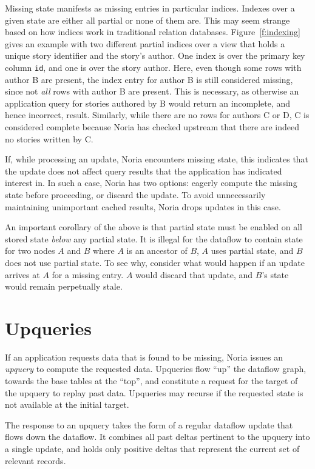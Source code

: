 Missing state manifests as missing entries in particular indices. Indexes over a
given state are either all partial or none of them are. This may seem strange
based on how indices work in traditional relation databases.
Figure~\vref{f:indexing} gives an example with two different partial indices
over a view that holds a unique story identifier and the story's author. One
index is over the primary key column \texttt{id}, and one is over the story
author. Here, even though some rows with author B are present, the index entry
for author B is still considered missing, since not \emph{all} rows with author
B are present. This is necessary, as otherwise an application query for stories
authored by B would return an incomplete, and hence incorrect, result.
Similarly, while there are no rows for authors C or D, C is considered complete
because Noria has checked upstream that there are indeed no stories written by
C.

If, while processing an update, Noria encounters missing state, this indicates
that the update does not affect query results that the application has indicated
interest in. In such a case, Noria has two options: eagerly compute the missing
state before proceeding, or discard the update. To avoid unnecessarily
maintaining unimportant cached results, Noria drops updates in this case.

An important corollary of the above is that partial state must be enabled
on all stored state \emph{below} any partial state. It is illegal for the
dataflow to contain state for two nodes $A$ and $B$ where $A$ is an ancestor of
$B$, $A$ uses partial state, and $B$ does not use partial state. To see why,
consider what would happen if an update arrives at $A$ for a missing entry. $A$
would discard that update, and $B$'s state would remain perpetually stale.

\section{Upqueries}
\label{s:upqueries}

If an application requests data that is found to be missing, Noria issues an
\textit{upquery} to compute the requested data. Upqueries flow ``up'' the
dataflow graph, towards the base tables at the ``top'', and constitute a request
for the target of the upquery to replay past data. Upqueries may recurse if the
requested state is not available at the initial target.

The response to an upquery takes the form of a regular dataflow update that
flows down the dataflow. It combines all past deltas pertinent to the upquery
into a single update, and holds only positive deltas that represent the current
set of relevant records.

